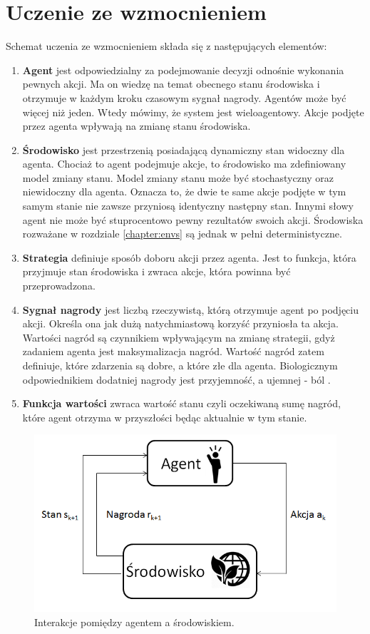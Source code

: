\documentclass[12pt]{book}
\theoremstyle{plain}
\begin{document}
\section{Uczenie ze wzmocnieniem} \label{sec:reincorcement}
Schemat uczenia ze wzmocnieniem składa się z następujących elementów:
\begin{enumerate}
	\item \textbf{Agent} jest odpowiedzialny za podejmowanie decyzji odnośnie wykonania pewnych akcji. Ma on wiedzę na temat obecnego stanu środowiska i otrzymuje w każdym kroku czasowym sygnał nagrody. Agentów może być więcej niż jeden. Wtedy mówimy, że system jest wieloagentowy. Akcje podjęte przez agenta wpływają na zmianę stanu środowiska.
	\item \textbf{Środowisko} jest przestrzenią posiadającą dynamiczny stan widoczny dla agenta. Chociaż to agent podejmuje akcje, to środowisko ma zdefiniowany model zmiany stanu. Model zmiany stanu może być stochastyczny oraz niewidoczny dla agenta. Oznacza to, że dwie te same akcje podjęte w tym samym stanie nie zawsze przyniosą identyczny następny stan. Innymi słowy agent nie może być stuprocentowo pewny rezultatów swoich akcji. Środowiska rozważane w rozdziale \ref{chapter:envs} są jednak w pełni deterministyczne.
	\item \textbf{Strategia} definiuje sposób doboru akcji przez agenta. Jest to funkcja, która przyjmuje stan środowiska i zwraca akcje, która powinna być przeprowadzona. 
	\item \textbf{Sygnał nagrody} jest liczbą rzeczywistą, którą otrzymuje agent po podjęciu akcji. Określa ona jak dużą natychmiastową korzyść przyniosła ta akcja. Wartości nagród są czynnikiem wpływającym na zmianę strategii, gdyż zadaniem agenta jest maksymalizacja nagród. Wartość nagród zatem definiuje, które zdarzenia są dobre, a które złe dla agenta. Biologicznym odpowiednikiem dodatniej nagrody jest przyjemność, a ujemnej - ból \cite{berridge2000reward}. 
	\item \textbf{Funkcja wartości} zwraca wartość stanu czyli oczekiwaną sumę nagród, które agent otrzyma w przyszłości będąc aktualnie w tym stanie. 
\end{enumerate}
\begin{figure}[H]
	\centering
	\includegraphics[width=14cm]{agent-srodowisko}
	\caption{Interakcje pomiędzy agentem a środowiskiem.}
	\label{fig:agent-srodowisko}
\end{figure}
\newpage
\end{document}
